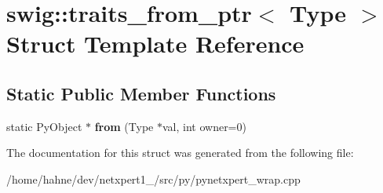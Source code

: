\hypertarget{structswig_1_1traits__from__ptr}{}\section{swig\+:\+:traits\+\_\+from\+\_\+ptr$<$ Type $>$ Struct Template Reference}
\label{structswig_1_1traits__from__ptr}
\subsection*{Static Public Member Functions}
\begin{DoxyCompactItemize}
\item 
static Py\+Object $\ast$ {\bfseries from} (Type $\ast$val, int owner=0)\hypertarget{structswig_1_1traits__from__ptr_a02f758f7fd32a799a85cf3509940ff02}{}\label{structswig_1_1traits__from__ptr_a02f758f7fd32a799a85cf3509940ff02}

\end{DoxyCompactItemize}


The documentation for this struct was generated from the following file\+:\begin{DoxyCompactItemize}
\item 
/home/hahne/dev/netxpert1\+\_/src/py/pynetxpert\+\_\+wrap.\+cpp\end{DoxyCompactItemize}
